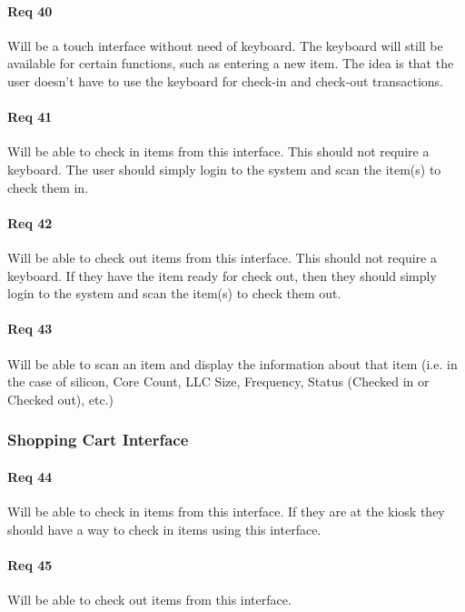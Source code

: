 \documentclass[10pt, onecolumn, twoside, peerreview]{IEEEtran}
\begin{document}
\paragraph*{Req 40} Will be a touch interface without need of keyboard. The keyboard will still be available for certain functions, such as
entering a new item. The idea is that the user doesn't have to use the keyboard for check-in and check-out
transactions.\\

\paragraph*{Req 41} Will be able to check in items from this interface. This should not require a keyboard. The user should simply login to
the system and scan the item(s) to check them in.\\

\paragraph*{Req 42} Will be able to check out items from this interface. This should not require a keyboard. If they have the item ready
for check out, then they should simply login to the system and scan the item(s) to check them out.\\

\paragraph*{Req 43} Will be able to scan an item and display the information about that item (i.e. in the case of silicon, Core Count, LLC
Size, Frequency, Status (Checked in or Checked out), etc.)\\

\subsubsection{Shopping Cart Interface}
\paragraph*{Req 44} Will be able to check in items from this interface. If they are at the kiosk they should have a way to check in items
using this interface.\\

\paragraph*{Req 45} Will be able to check out items from this interface.\\
\end{document}
